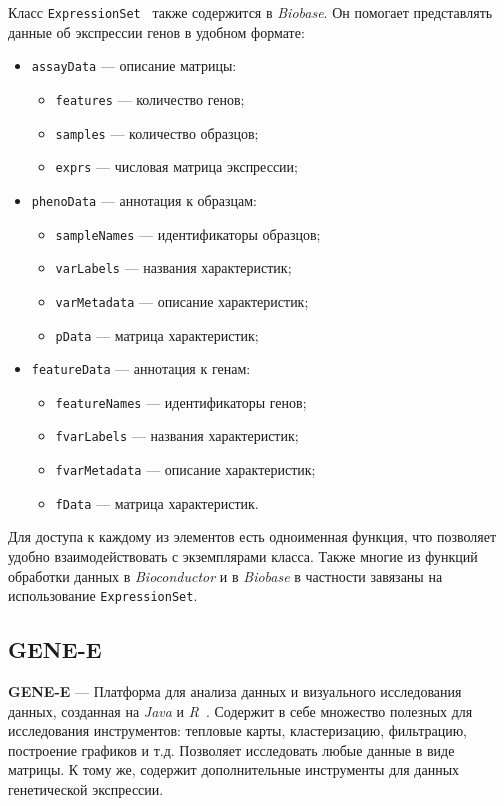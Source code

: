 Класс \texttt{ExpressionSet}~\cite{expressionset} также содержится в \emph{Biobase}. Он помогает представлять данные об экспрессии генов в удобном формате:
\begin{itemize}
\item \texttt{assayData} --- описание матрицы:\begin{itemize}
\item \texttt{features} --- количество генов;
\item \texttt{samples} --- количество образцов;
\item \texttt{exprs} --- числовая матрица экспрессии; \end{itemize}
\item \texttt{phenoData} --- аннотация к образцам:\begin{itemize}
\item \texttt{sampleNames} --- идентификаторы образцов;
\item \texttt{varLabels} --- названия характеристик;
\item \texttt{varMetadata} --- описание характеристик;
\item \texttt{pData} --- матрица характеристик;\end{itemize}
\item \texttt{featureData} --- аннотация к генам:\begin{itemize}
\item \texttt{featureNames} --- идентификаторы генов;
\item \texttt{fvarLabels} --- названия характеристик;
\item \texttt{fvarMetadata} --- описание характеристик;
\item \texttt{fData} --- матрица характеристик.\end{itemize}
\end{itemize}

Для доступа к каждому из элементов есть одноименная функция, что позволяет удобно взаимодействовать с экземплярами класса. Также многие из функций обработки данных в \emph{Bioconductor} и в \emph{Biobase} в частности завязаны на использование \texttt{ExpressionSet}.


\subsection{GENE-E}
\textbf{GENE-E} --- Платформа для анализа данных и визуального исследования данных, созданная на \emph{Java} и \emph{R}~\cite{genee}. Содержит в себе множество полезных для исследования инструментов: тепловые карты, кластеризацию, фильтрацию, построение графиков и т.д. Позволяет исследовать любые данные в виде матрицы. К тому же, содержит дополнительные инструменты для данных генетической экспрессии.

